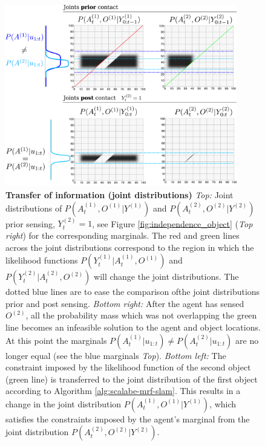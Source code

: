 \begin{figure}
  \centering
  \includegraphics[width=0.9\textwidth]{./ch5-MLMF/Figures/pao_prior_post_v2.pdf}
  \caption{\textbf{Transfer of information (joint distributions)} 
  \textit{Top:}  Joint distributions of $P(A^{(1)}_t,O^{(1)}|Y^{(1)})$ and $P(A^{(2)}_t,O^{(2)}|Y^{(2)})$ prior sensing, $Y_t^{(2)}=1$, see Figure \ref{fig:independence_object}
  (\textit{Top right}) for the corresponding marginals. The red and green lines across the joint distributions 
   correspond to the region in which the likelihood functions $P(Y^{(1)}_{t}|A^{(1)}_t,O^{(1)})$ and $P(Y^{(2)}_{t}|A^{(2)}_t,O^{(2)})$ will change the joint distributions.
  The dotted blue lines are to ease the comparison ofthe joint distributions prior and post sensing.
  \textit{Bottom right:}  After the agent has sensed $O^{(2)}$, all the probability mass which was not overlapping the green line becomes an infeasible
  solution to the agent and object locations. At this point the marginals $P(A^{(1)}_t|u_{1:t}) \not= P(A^{(2)}_t|u_{1:t})$ are no longer equal 
  (see the blue marginals \textit{Top}). \textit{Bottom left:} The constraint imposed by the likelihood function of the second object
  (green line) is transferred to the joint distribution of the first object according to Algorithm \ref{alg:scalabe-mrf-slam}.
  This results in a change in the joint distribution  $P(A^{(1)}_t,O^{(1)}|Y^{(1)})$, which satisfies the constraints 
  imposed by the agent's marginal from the joint distribution $P(A^{(2)}_t,O^{(2)}|Y^{(2)})$.}
  \label{fig:transfer_information}
\end{figure}

